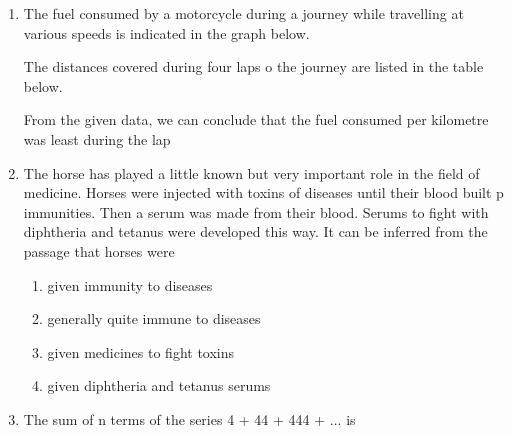 \documentclass[journal,12pt,onecolumn]{IEEEtran}
\theoremstyle{remark}
\begin{document}
\begin{enumerate}
\begin{enumerate}
	\end{enumerate}
\item The fuel consumed by a motorcycle during a journey while travelling at various speeds is indicated in the graph below.
	\begin{figure}[H]
		\centering
		
		\caption{}
		\label{25}
	\end{figure}
	The distances covered during four laps o the journey are listed in the table below.
	\begin{figure}[H]
		\centering
		
		\caption{}
		\label{25}
	\end{figure}
	From the given data, we can conclude that the fuel consumed per kilometre was least during the lap
	\begin{enumerate}
	\end{enumerate}
\item The horse has played a little known but very important role in the field of medicine. Horses were injected with toxins of diseases until their blood built p immunities. Then a serum was made from their blood. Serums to fight with diphtheria and tetanus were developed this way.
	It can be inferred from the passage that horses were
	\begin{enumerate}
		\item given immunity to diseases
		\item generally quite immune to diseases
		\item given medicines to fight toxins
		\item given diphtheria and tetanus serums
	\end{enumerate}
\item The sum of n terms of the series 4 + 44 + 444 + $\dots$ is
	\begin{enumerate}
\end{enumerate}
\end{enumerate}
\end{document}
